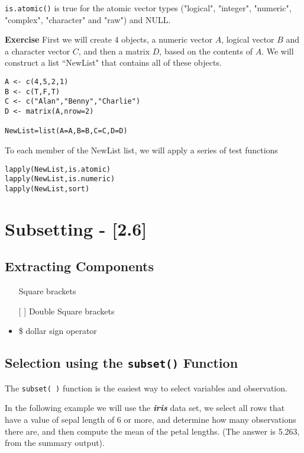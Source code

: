 \documentclass[a4paper,12pt]{article}
\begin{document}
\texttt{is.atomic()} is true for the atomic vector 
types ("logical", "integer", "numeric", "complex", "character" and "raw") and NULL.

\noindent\textbf{Exercise} First we will create 4 objects, a numeric vector $A$, 
logical vector $B$ and a character vector $C$, and then a matrix $D$, based on 
the contents of $A$. We will construct a list ``NewList" that contains all of these objects.

\begin{framed}
\begin{verbatim}
A <- c(4,5,2,1)
B <- c(T,F,T)
C <- c("Alan","Benny","Charlie")
D <- matrix(A,nrow=2)

NewList=list(A=A,B=B,C=C,D=D)
\end{verbatim}
\end{framed}
To each member of the NewList list, we will apply a series of test functions
\begin{framed}
\begin{verbatim}
lapply(NewList,is.atomic)
lapply(NewList,is.numeric)
lapply(NewList,sort)
\end{verbatim}
\end{framed}
\newpage
\section*{Subsetting - [2.6]}
\subsection*{Extracting Components}

\begin{itemize}
\item []  Square brackets
\item [[ ]]  Double Square brackets
\item \$  dollar sign operator
\end{itemize}


\subsection*{Selection using the \texttt{subset()} Function}
The \texttt{subset( )} function is the easiest way to select variables and observation. 

In the following example we will use the \textit{\textbf{iris}} data set, we select all rows that have a value of sepal length of 6 or more, and determine how many observations there are, and then compute the mean of the petal lengths. (The answer is 5.263, from the summary output).
\end{document}
